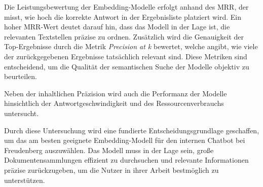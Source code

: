 Die Leistungsbewertung der Embedding-Modelle erfolgt anhand des \ac{MRR}, der misst, wie hoch die korrekte Antwort in der Ergebnisliste platziert wird. Ein hoher \ac{MRR}-Wert deutet darauf hin, 
dass das Modell in der Lage ist, die relevanten Textstellen präzise zu ordnen. 
Zusätzlich wird die Genauigkeit der Top-Ergebnisse durch die Metrik \textit{Precision at k} bewertet, welche angibt, wie viele der zurückgegebenen Ergebnisse tatsächlich relevant sind. 
Diese Metriken sind entscheidend, um die Qualität der semantischen Suche der Modelle objektiv zu beurteilen.

Neben der inhaltlichen Präzision wird auch die Performanz der Modelle hinsichtlich der Antwortgeschwindigkeit und des Ressourcenverbrauchs untersucht. 

Durch diese Untersuchung wird eine fundierte Entscheidungsgrundlage geschaffen, um das am besten geeignete Embedding-Modell für den internen Chatbot bei Freudenberg auszuwählen. Das Modell muss in der Lage sein, 
große Dokumentensammlungen effizient zu durchsuchen und relevante Informationen präzise zurückzugeben, um die Nutzer in ihrer Arbeit bestmöglich zu unterstützen.
